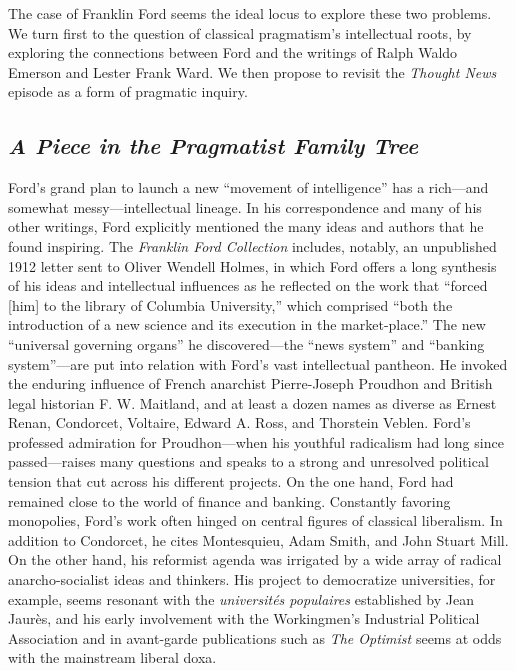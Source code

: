 \documentclass[openany,nobib]{tufte-book}
\begin{document}
The case of Franklin Ford seems the ideal locus to explore these two
problems. We turn first to the question of classical pragmatism's
intellectual roots, by exploring the connections between Ford and the
writings of Ralph Waldo Emerson and Lester Frank Ward. We then propose
to revisit the \emph{Thought News} episode as a form of pragmatic
inquiry.

\hypertarget{a-piece-in-the-pragmatist-family-tree}{%
\subsection{\texorpdfstring{\emph{A Piece in the Pragmatist Family
Tree}}{A Piece in the Pragmatist Family Tree}}\label{a-piece-in-the-pragmatist-family-tree}}

Ford's grand plan to launch a new ``movement of intelligence'' has a
rich---and somewhat messy---intellectual lineage. In his correspondence
and many of his other writings, Ford explicitly mentioned the many ideas
and authors that he found inspiring. The \emph{Franklin Ford Collection}
includes, notably, an unpublished 1912 letter sent to Oliver Wendell
Holmes, in which Ford offers a long synthesis of his ideas and
intellectual influences as he reflected on the work that ``forced
{[}him{]} to the library of Columbia University,'' which comprised
``both the introduction of a new science and its execution in the
market-place.'' The new ``universal governing organs'' he
discovered---the ``news system'' and ``banking system''---are put into
relation with Ford's vast intellectual pantheon. He invoked the enduring
influence of French anarchist Pierre-Joseph Proudhon and British legal
historian F. W. Maitland, and at least a dozen names as diverse as
Ernest Renan, Condorcet, Voltaire, Edward A. Ross, and Thorstein Veblen.
Ford's professed admiration for Proudhon---when his youthful radicalism
had long since passed---raises many questions and speaks to a strong and
unresolved political tension that cut across his different projects. On
the one hand, Ford had remained close to the world of finance and
banking. Constantly favoring monopolies, Ford's work often hinged on
central figures of classical liberalism. In addition to Condorcet, he
cites Montesquieu, Adam Smith, and John Stuart Mill. On the other hand,
his reformist agenda was irrigated by a wide array of radical
anarcho-socialist ideas and thinkers. His project to democratize
universities, for example, seems resonant with the \emph{universités
populaires} established by Jean Jaurès, and his early involvement
with the Workingmen's Industrial Political Association and in
avant-garde publications such as \emph{The Optimist} seems at odds with
the mainstream liberal doxa.
\end{document}
